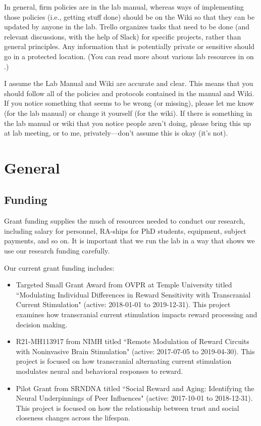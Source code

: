\documentclass[letterpaper,12pt,oneside]{memoir}
\begin{document}
In general, firm policies are in the lab manual, whereas ways of implementing those policies (i.e., getting stuff done) should be on the Wiki so that they can be updated by anyone in the lab. Trello organizes tasks that need to be done (and relevant discussions, with the help of Slack) for specific projects, rather than general principles. Any information that is potentially private or sensitive should go in a protected location. (You can read more about various lab resources in  on .)

\begin{shaded}
\noindent I assume the Lab Manual and Wiki are accurate and clear. This means that you should follow all of the policies and protocols contained in the manual and Wiki. If you notice something that seems to be wrong (or missing), please let me know (for the lab manual) or change it yourself (for the wiki). If there is something in the lab manual or wiki that you notice people aren't doing, please bring this up at lab meeting, or to me, privately---don't assume this is okay (it's not).
\end{shaded}


\chapter{General} %

\section{Funding}

Grant funding supplies the much of resources needed to conduct our research, including salary for personnel, RA-ships for PhD students, equipment, subject payments, and so on. It is important that we run the lab in a way that shows we use our research funding carefully. 

Our current grant funding includes:

\begin{itemize}

\item Targeted Small Grant Award from OVPR at Temple University titled ``Modulating Individual Differences in Reward Sensitivity with Transcranial Current Stimulation" (active: 2018-01-01 to 2019-12-31). This project examines how transcranial current stimulation impacts reward processing and decision making.
\item R21-MH113917 from NIMH titled ``Remote Modulation of Reward Circuits with Noninvasive Brain Stimulation" (active: 2017-07-05 to 2019-04-30). This project is focused on how transcranial alternating current stimulation modulates neural and behavioral responses to reward. 
\item Pilot Grant from SRNDNA titled ``Social Reward and Aging: Identifying the Neural Underpinnings of Peer Influences" (active: 2017-10-01 to 2018-12-31). This project is focused on how the relationship between trust and social closeness changes across the lifespan. 

\end{itemize}
\end{document}
